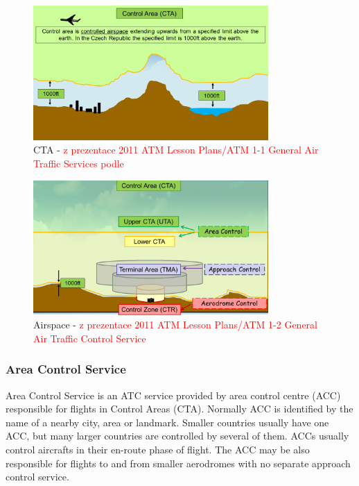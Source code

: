 \begin{figure}[h]
    \centering
    \includegraphics[width=0.8\textwidth]{figures/cta.png}
    \caption{CTA - \textcolor{red}{z prezentace 2011 ATM Lesson Plans/ATM 1-1 General Air Traffic Services podle \cite[Chapter 2.10]{annex11}%
    }}
    \label{fig:cta}
\end{figure}

\begin{figure}[h]
    \centering
    \includegraphics[width=0.8\textwidth]{figures/airspace2.png}
    \caption{Airspace - \textcolor{red}{z prezentace 2011 ATM Lesson Plans/ATM 1-2 General Air Traffic Control Service \cite[Chapter 2.10]{annex11}%
    }}
    \label{fig:airspace2}
\end{figure}

\subsubsection{Area Control Service}
Area Control Service is an ATC service provided by area control centre (ACC) responsible for flights in Control Areas (CTA). Normally ACC is identified by the name of a nearby city, area or landmark. Smaller countries usually have one ACC, but many larger countries are controlled by several of them. ACCs usually control aircrafts in their en-route phase of flight. The ACC may be also responsible for flights to and from smaller aerodromes with no separate approach control service. \cite[Chapter 3.2]{annex11}

